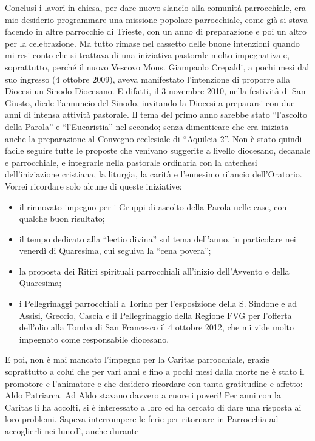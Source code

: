 \medbreak
Conclusi i lavori in chiesa, per dare nuovo slancio alla comunità parrocchiale, era mio 
desiderio programmare una missione popolare parrocchiale, come già si stava facendo in altre 
parrocchie di Trieste, con un anno di preparazione e poi un altro per la celebrazione. 
Ma tutto rimase nel cassetto delle buone intenzioni quando mi resi conto che si trattava di una 
iniziativa pastorale molto impegnativa e, soprattutto, perché il nuovo Vescovo Mons. Giampaolo 
Crepaldi, a pochi mesi dal suo ingresso (4 ottobre 2009), aveva manifestato l'intenzione di proporre 
alla Diocesi un Sinodo Diocesano. 
E difatti, il 3 novembre 2010, nella festività di San Giusto, diede l'annuncio del Sinodo, invitando la 
Diocesi a prepararsi con due anni di intensa attività pastorale. 
Il tema del primo anno sarebbe stato “l'ascolto della Parola” e “l'Eucaristia” nel secondo; senza 
dimenticare che era iniziata anche la preparazione al Convegno ecclesiale di “Aquileia 2”.
Non è stato quindi facile seguire tutte le proposte che venivano suggerite a livello diocesano, 
decanale e parrocchiale, e integrarle nella pastorale ordinaria con la catechesi dell'iniziazione 
cristiana, la liturgia, la carità e l'ennesimo rilancio dell'Oratorio. 
Vorrei ricordare solo alcune di queste iniziative:
\begin{itemize}
	\item il rinnovato impegno per i Gruppi di ascolto della Parola nelle case, con qualche buon risultato;
	\item il tempo dedicato alla “lectio divina” sul tema dell'anno, in particolare nei venerdì di Quaresima, 
cui seguiva la “cena povera”;
	\item la proposta dei Ritiri spirituali parrocchiali all'inizio dell'Avvento e della Quaresima;
	\item i Pellegrinaggi parrocchiali a Torino per l'esposizione della S. Sindone e ad Assisi, Greccio, 
Cascia e il Pellegrinaggio della Regione FVG per l'offerta dell'olio alla Tomba di San Francesco il 4 
ottobre 2012, che mi vide molto impegnato come responsabile diocesano.
\end{itemize}
E poi, non è mai mancato l'impegno per la Caritas parrocchiale, grazie soprattutto a colui 
che per vari anni e fino a pochi mesi dalla morte ne è stato il promotore e l'animatore e che desidero 
ricordare con tanta gratitudine e affetto: Aldo Patriarca. 
Ad Aldo stavano davvero a cuore i poveri! Per anni con la Caritas li ha accolti, si è interessato a 
loro ed ha cercato di dare una risposta ai loro problemi.
Sapeva interrompere le ferie per ritornare in Parrocchia ad accoglierli nei lunedì, anche durante 
